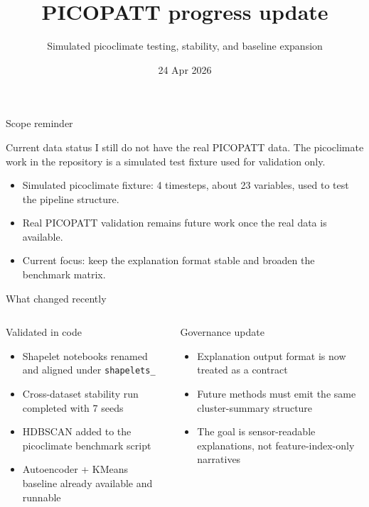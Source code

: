 \documentclass[aspectratio=169]{beamer}
\title[Progress update]{PICOPATT progress update}
\subtitle{Simulated picoclimate testing, stability, and baseline expansion}
\institute{LIRMM}
\date{24 Apr 2026}
\begin{document}
\begin{frame}
  \titlepage
\end{frame}

\begin{frame}{Scope reminder}
  \begin{block}{Current data status}
    I still do not have the real PICOPATT data. The picoclimate work in the repository is a simulated test fixture used for validation only.
  \end{block}
  \vspace{0.5em}
  \begin{itemize}
    \item Simulated picoclimate fixture: 4 timesteps, about 23 variables, used to test the pipeline structure.
    \item Real PICOPATT validation remains future work once the real data is available.
    \item Current focus: keep the explanation format stable and broaden the benchmark matrix.
  \end{itemize}
\end{frame}

\begin{frame}{What changed recently}
  \begin{columns}[T,onlytextwidth]
    \begin{block}{Validated in code}
      \begin{itemize}
        \item Shapelet notebooks renamed and aligned under \texttt{shapelets\_}
        \item Cross-dataset stability run completed with 7 seeds
        \item HDBSCAN added to the picoclimate benchmark script
        \item Autoencoder + KMeans baseline already available and runnable
      \end{itemize}
    \end{block}

    \begin{block}{Governance update}
      \begin{itemize}
        \item Explanation output format is now treated as a contract
        \item Future methods must emit the same cluster-summary structure
        \item The goal is sensor-readable explanations, not feature-index-only narratives
      \end{itemize}
    \end{block}
  \end{columns}
\end{frame}
\end{document}
